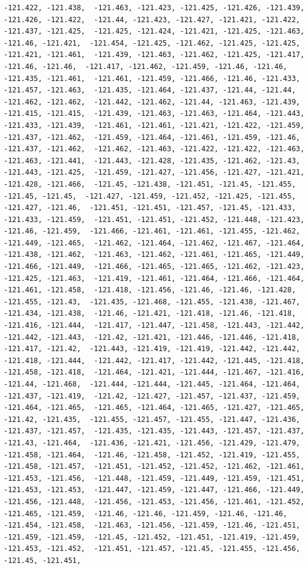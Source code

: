 \documentclass[
]{article}
\begin{document}
\begin{verbatim}
-121.422, -121.438,  -121.463, -121.423, -121.425, -121.426, -121.439, -121.426, -121.422,  -121.44, -121.423, -121.427, -121.421, -121.422, -121.437, -121.425,  -121.425, -121.424, -121.421, -121.425, -121.463, -121.46, -121.421,  -121.454, -121.425, -121.462, -121.425, -121.425, -121.421, -121.461,  -121.439, -121.463, -121.462, -121.425, -121.417, -121.46, -121.46,  -121.417, -121.462, -121.459, -121.46, -121.46, -121.435, -121.461,  -121.461, -121.459, -121.466, -121.46, -121.433, -121.457, -121.463,  -121.435, -121.464, -121.437, -121.44, -121.44, -121.462, -121.462,  -121.442, -121.462, -121.44, -121.463, -121.439, -121.415, -121.415,  -121.439, -121.463, -121.463, -121.464, -121.443, -121.433, -121.439,  -121.461, -121.461, -121.421, -121.422, -121.459, -121.437, -121.462,  -121.459, -121.464, -121.461, -121.459, -121.46, -121.437, -121.462,  -121.462, -121.463, -121.422, -121.422, -121.463, -121.463, -121.441,  -121.443, -121.428, -121.435, -121.462, -121.43, -121.443, -121.425,  -121.459, -121.427, -121.456, -121.427, -121.421, -121.428, -121.466,  -121.45, -121.438, -121.451, -121.45, -121.455, -121.45, -121.45,  -121.427, -121.459, -121.452, -121.425, -121.455, -121.427, -121.46,  -121.451, -121.451, -121.457, -121.45, -121.433, -121.433, -121.459,  -121.451, -121.451, -121.452, -121.448, -121.423, -121.46, -121.459,  -121.466, -121.461, -121.461, -121.455, -121.462, -121.449, -121.465,  -121.462, -121.464, -121.462, -121.467, -121.464, -121.438, -121.462,  -121.463, -121.462, -121.461, -121.465, -121.449, -121.466, -121.449,  -121.466, -121.465, -121.465, -121.462, -121.423, -121.425, -121.463,  -121.419, -121.461, -121.464, -121.466, -121.464, -121.461, -121.458,  -121.418, -121.456, -121.46, -121.46, -121.428, -121.455, -121.43,  -121.435, -121.468, -121.455, -121.438, -121.467, -121.434, -121.438,  -121.46, -121.421, -121.418, -121.46, -121.418, -121.416, -121.444,  -121.417, -121.447, -121.458, -121.443, -121.442, -121.442, -121.443,  -121.42, -121.421, -121.446, -121.446, -121.418, -121.417, -121.42,  -121.443, -121.419, -121.419, -121.442, -121.442, -121.418, -121.444,  -121.442, -121.417, -121.442, -121.445, -121.418, -121.458, -121.418,  -121.464, -121.421, -121.444, -121.467, -121.416, -121.44, -121.468,  -121.444, -121.444, -121.445, -121.464, -121.464, -121.437, -121.419,  -121.42, -121.427, -121.457, -121.437, -121.459, -121.464, -121.465,  -121.465, -121.464, -121.465, -121.427, -121.465, -121.42, -121.435,  -121.455, -121.457, -121.455, -121.447, -121.436, -121.437, -121.457,  -121.435, -121.435, -121.443, -121.457, -121.437, -121.43, -121.464,  -121.436, -121.421, -121.456, -121.429, -121.479, -121.458, -121.464,  -121.46, -121.458, -121.452, -121.419, -121.455, -121.458, -121.457,  -121.451, -121.452, -121.452, -121.462, -121.461, -121.453, -121.456,  -121.448, -121.459, -121.449, -121.459, -121.451, -121.453, -121.453,  -121.447, -121.459, -121.447, -121.466, -121.449, -121.456, -121.448,  -121.456, -121.453, -121.456, -121.461, -121.452, -121.465, -121.459,  -121.46, -121.46, -121.459, -121.46, -121.46, -121.454, -121.458,  -121.463, -121.456, -121.459, -121.46, -121.451, -121.459, -121.459,  -121.45, -121.452, -121.451, -121.419, -121.459, -121.453, -121.452,  -121.451, -121.457, -121.45, -121.455, -121.456, -121.45, -121.451,  
\end{verbatim}
\end{document}
